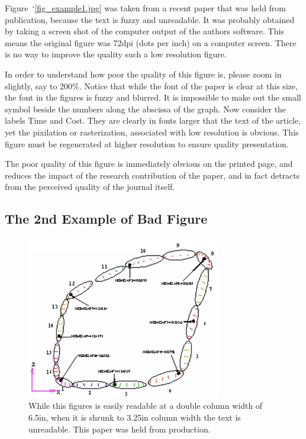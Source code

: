 \documentclass[10pt,cleanfoot]{asme2ej}
\begin{document}
Figure~`\ref{fig_example1.jpg}
was taken from a recent paper that was held from publication, because the text is fuzzy and unreadable. It was probably obtained by taking a screen shot of the computer output of the authors software. This means the original figure was 72dpi (dots per inch) on a computer screen. There is no way to improve the quality such a low resolution figure.
 
In order to understand how poor the quality of this figure is, please zoom in slightly, say to 200\%. Notice that while the font of the paper is clear at this size, the font in the figures is fuzzy and blurred. It is impossible to make out the small symbol beside the numbers along the abscissa of the graph. Now consider the labels Time and Cost. They are clearly in fonts larger that the text of the article, yet the pixilation or rasterization, associated with low resolution is obvious. This figure must be regenerated at higher resolution to ensure quality presentation.

The poor quality of this figure is immediately obvious on the printed page, and reduces the impact of the research contribution of the paper, and in fact detracts from the perceived quality of the journal itself.



\subsection{The 2nd Example of Bad Figure}

\begin{figure} 
\centerline{\includegraphics[width=3.34in]{figure/FMANU_MD_05_1272_5.jpg}}
\caption{While this figures is easily readable at a double column width of 6.5in, when it is shrunk to 3.25in column width the text is unreadable.   This paper was held from production.}
\label{fig_example2.jpg}
\end{figure}
\end{document}
